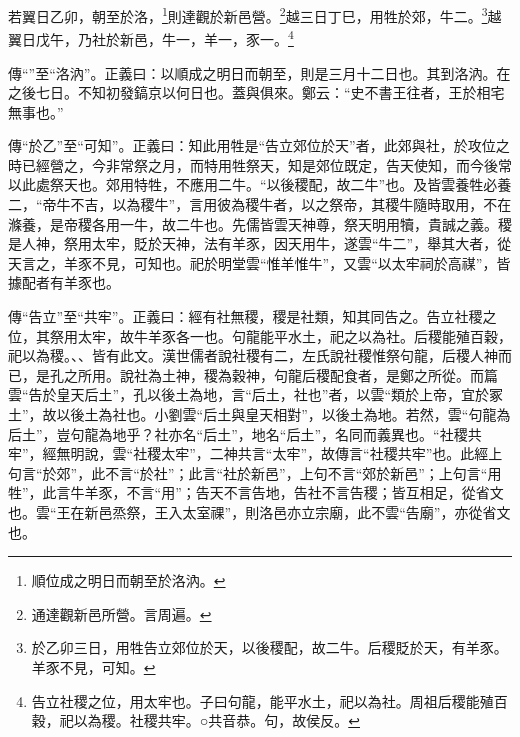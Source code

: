 若翼日乙卯，朝至於洛，\footnote{順位成之明日而朝至於洛汭。}則達觀於新邑營。\footnote{通達觀新邑所營。言周遍。}越三日丁巳，用牲於郊，牛二。\footnote{於乙卯三日，用牲告立郊位於天，以後稷配，故二牛。后稷貶於天，有羊豕。羊豕不見，可知。}越翼日戊午，乃社於新邑，牛一，羊一，豕一。\footnote{告立社稷之位，用太牢也。子曰句龍，能平水土，祀以為社。周祖后稷能殖百穀，祀以為稷。社稷共牢。○共音恭。句，故侯反。}


{\noindent\zhuan{}\fzbyks 傳“”至“洛汭”。正義曰：以順成之明日而朝至，則是三月十二日也。其到洛汭。在之後七日。不知初發鎬京以何日也。蓋與俱來。鄭云：“史不書王往者，王於相宅無事也。” \par}

{\noindent\zhuan{}\fzbyks 傳“於乙”至“可知”。正義曰：知此用牲是“告立郊位於天”者，此郊與社，於攻位之時已經營之，今非常祭之月，而特用牲祭天，知是郊位既定，告天使知，而今後常以此處祭天也。郊用特牲，不應用二牛。“以後稷配，故二牛”也。及皆雲養牲必養二，“帝牛不吉，以為稷牛”，言用彼為稷牛者，以之祭帝，其稷牛隨時取用，不在滌養，是帝稷各用一牛，故二牛也。先儒皆雲天神尊，祭天明用犢，貴誠之義。稷是人神，祭用太牢，貶於天神，法有羊豕，因天用牛，遂雲“牛二”，舉其大者，從天言之，羊豕不見，可知也。祀於明堂雲“惟羊惟牛”，又雲“以太牢祠於高禖”，皆據配者有羊豕也。 \par}

{\noindent\zhuan{}\fzbyks 傳“告立”至“共牢”。正義曰：經有社無稷，稷是社類，知其同告之。告立社稷之位，其祭用太牢，故牛羊豕各一也。句龍能平水土，祀之以為社。后稷能殖百穀，祀以為稷。、、皆有此文。漢世儒者說社稷有二，左氏說社稷惟祭句龍，后稷人神而已，是孔之所用。說社為土神，稷為穀神，句龍后稷配食者，是鄭之所從。而篇雲“告於皇天后土”，孔以後土為地，言“后土，社也”者，以雲“類於上帝，宜於冢土”，故以後土為社也。小劉雲“后土與皇天相對”，以後土為地。若然，雲“句龍為后土”，豈句龍為地乎？社亦名“后土”，地名“后土”，名同而義異也。“社稷共牢”，經無明說，雲“社稷太牢”，二神共言“太牢”，故傳言“社稷共牢”也。此經上句言“於郊”，此不言“於社”；此言“社於新邑”，上句不言“郊於新邑”；上句言“用牲”，此言牛羊豕，不言“用”；告天不言告地，告社不言告稷；皆互相足，從省文也。雲“王在新邑烝祭，王入太室祼”，則洛邑亦立宗廟，此不雲“告廟”，亦從省文也。 \par}

